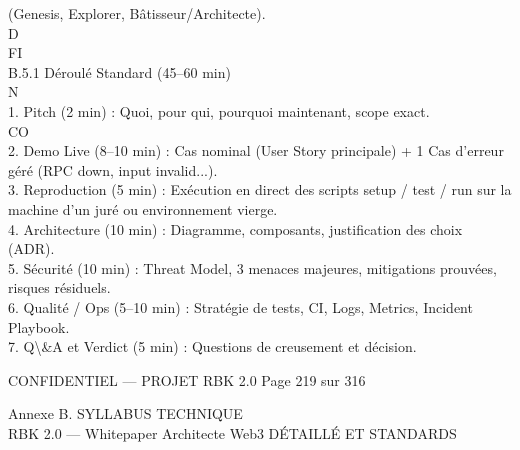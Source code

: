 (Genesis, Explorer, Bâtisseur/Architecte).\\
\vspace{0.5em}
\vspace{0.5em}
\vspace{0.5em}
\vspace{0.5em}
D\\
FI\\
B.5.1 Déroulé Standard (45–60 min)\\
\vspace{0.5em}
\vspace{0.5em}
N\\
1. Pitch (2 min) : Quoi, pour qui, pourquoi maintenant, scope exact.\\
CO\\
2. Demo Live (8–10 min) : Cas nominal (User Story principale) + 1 Cas d’erreur géré (RPC down, input invalid...).\\
\vspace{0.5em}
3. Reproduction (5 min) : Exécution en direct des scripts setup / test / run sur la machine d’un juré ou environnement vierge.\\
\vspace{0.5em}
4. Architecture (10 min) : Diagramme, composants, justification des choix (ADR).\\
\vspace{0.5em}
5. Sécurité (10 min) : Threat Model, 3 menaces majeures, mitigations prouvées, risques résiduels.\\
\vspace{0.5em}
6. Qualité / Ops (5–10 min) : Stratégie de tests, CI, Logs, Metrics, Incident Playbook.\\
\vspace{0.5em}
7. Q\textbackslash{}&A et Verdict (5 min) : Questions de creusement et décision.\\
\vspace{0.5em}
\vspace{0.5em}
\vspace{0.5em}
\begin{confidential}CONFIDENTIEL — PROJET RBK 2.0                                Page 219 sur 316\end{confidential}
Annexe B. SYLLABUS TECHNIQUE\\
RBK 2.0 — Whitepaper Architecte Web3                                                                              DÉTAILLÉ ET STANDARDS\\
\vspace{0.5em}
\vspace{0.5em}
